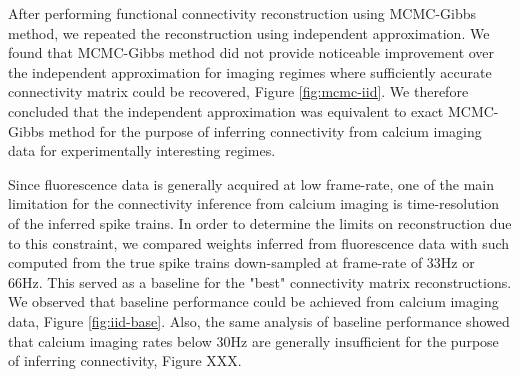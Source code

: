 After performing functional connectivity reconstruction using MCMC-Gibbs method, we repeated the reconstruction using independent approximation. We found that MCMC-Gibbs method did not provide noticeable improvement over the independent approximation for imaging regimes where sufficiently accurate connectivity matrix could be recovered, Figure \ref{fig:mcmc-iid}. We therefore concluded that the independent approximation was equivalent to exact MCMC-Gibbs method for the purpose of inferring connectivity from calcium imaging data for experimentally interesting regimes.

Since fluorescence data is generally acquired at low frame-rate, one of the main limitation for the connectivity inference from calcium imaging is time-resolution of the inferred spike trains. In order to determine the limits on reconstruction due to this constraint, we compared weights inferred from fluorescence data with such computed from the true spike trains down-sampled at frame-rate of 33Hz or 66Hz. This served as a baseline for the "best" connectivity matrix reconstructions. We observed that baseline performance could be achieved from calcium imaging data, Figure \ref{fig:iid-base}.  Also, the same analysis of baseline performance showed that calcium imaging rates below 30Hz are generally insufficient for the purpose of inferring connectivity, Figure XXX.

